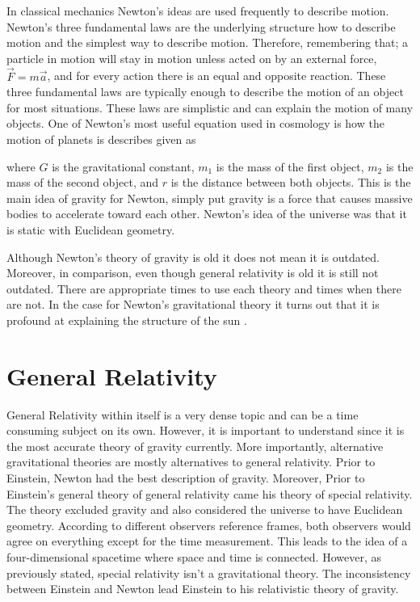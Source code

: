 \documentclass[a4paper]{article}
\begin{document}
In classical mechanics Newton's ideas are used frequently to describe motion. Newton's three fundamental laws are the underlying structure how to describe motion and the simplest way to describe motion. Therefore, remembering that;  a particle in motion will stay in motion unless acted on by an external force, $\vec{F} = m\vec{a}$, and for every action there is an equal and opposite reaction. These three fundamental laws are typically enough to describe the motion of an object for most situations. These laws are simplistic and can explain the motion of many objects. One of Newton's most useful equation used in cosmology is how the motion of planets is describes given as 


where $G$ is the gravitational constant, $m_{1}$ is the mass of the first object, $m_{2}$ is the mass of the second object, and $r$ is the distance between both objects. This is the main idea of gravity for Newton, simply put gravity is a force that causes massive bodies to accelerate toward each other. Newton's idea of the universe was that it is static with Euclidean geometry. 

Although Newton's theory of gravity is old it does not mean it is outdated. Moreover, in comparison, even though general relativity is old it is still not outdated. There are appropriate times to use each theory and times when there are not. In the case for Newton's gravitational theory it turns out that it is profound at explaining the structure of the sun \cite{hartle_2003}.

\section{General Relativity}
General Relativity within itself is a very dense topic and can be a time consuming subject on its own. However, it is important to understand since it is the most accurate theory of gravity currently. More importantly, alternative gravitational theories are mostly alternatives to general relativity. Prior to Einstein, Newton had the best description of gravity. Moreover, Prior to Einstein's general theory of general relativity came his theory of special relativity. The theory excluded gravity and also considered the universe to have Euclidean geometry. According to different observers reference frames, both observers would agree on everything except for the time measurement. This leads to the idea of a four-dimensional spacetime where space and time is connected. However, as previously stated, special relativity isn't a gravitational theory. The inconsistency between Einstein and Newton lead Einstein to his relativistic theory of gravity.
\end{document}
